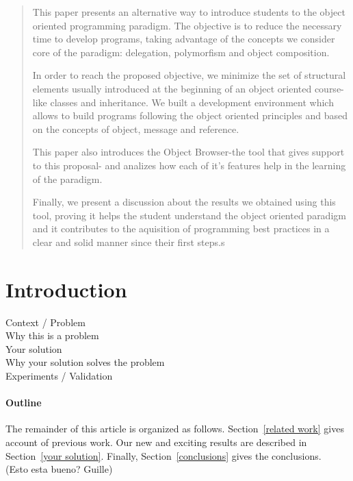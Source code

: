 \documentclass[11pt, twocolumn]{article}
\begin{document}
\maketitle

\begin{abstract}
This paper presents an alternative way to introduce students to the object oriented programming paradigm.  The objective is to reduce the necessary time to develop programs, taking advantage of the concepts we consider core of the paradigm: delegation, polymorfism and object composition.

In order to reach the proposed objective, we minimize the set of structural elements usually introduced at the beginning of an object oriented course-like classes and inheritance.  We built a development environment which allows to build programs following the object oriented principles and based on the concepts of object, message and reference.

This paper also introduces the Object Browser-the tool that gives support to this proposal- and analizes how each of it's features help in the learning of the paradigm.

Finally, we present a discussion about the results we obtained using this tool, proving it helps the student understand the object oriented paradigm and it contributes to the aquisition of programming best practices in a clear and solid manner since their first steps.s

\end{abstract}

\section{Introduction}
Context / Problem\\
Why this is a problem\\
Your solution\\
Why your solution solves the problem\\
Experiments / Validation\\

\paragraph{Outline}
The remainder of this article is organized as follows.\cite{Gil:02}
Section~\ref{related work} gives account of previous work.
Our new and exciting results are described in Section~\ref{your solution}.
Finally, Section~\ref{conclusions} gives the conclusions.\\
 (Esto esta bueno? Guille)
\end{document}
